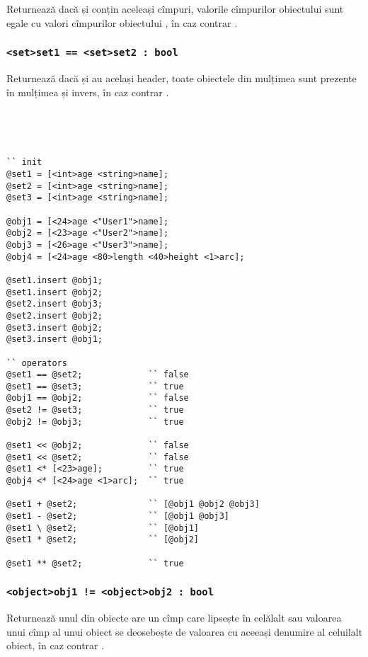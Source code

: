 Returnează \true{} dacă  și  conțin aceleași cîmpuri, valorile cîmpurilor obiectului  sunt egale cu valori cîmpurilor obiectului , în caz contrar \false{}.

\subsubsection{\lstinline|<set>set1 == <set>set2 : bool|}

Returnează \true{} dacă  și  au același header, toate obiectele din mulțimea  sunt prezente în mulțimea  și invers, în caz contrar \false{}.

\

\

\begin{lstlisting}[caption=Exemple de folosire al operatorilor asupra tipului object și set, label=setobjopex]
`` init
@set1 = [<int>age <string>name];
@set2 = [<int>age <string>name];
@set3 = [<int>age <string>name];

@obj1 = [<24>age <"User1">name];
@obj2 = [<23>age <"User2">name];
@obj3 = [<26>age <"User3">name];
@obj4 = [<24>age <80>length <40>height <1>arc];

@set1.insert @obj1;
@set1.insert @obj2;
@set2.insert @obj3;
@set2.insert @obj2;
@set3.insert @obj2;
@set3.insert @obj1;

`` operators
@set1 == @set2;				`` false
@set1 == @set3;				`` true
@obj1 == @obj2;				`` false
@set2 != @set3;				`` true
@obj2 != @obj3;				`` true

@set1 << @obj2;				`` false
@set1 << @set2;				`` false
@set1 <* [<23>age];			`` true
@obj4 <* [<24>age <1>arc];	`` true

@set1 + @set2;				`` [@obj1 @obj2 @obj3]
@set1 - @set2;				`` [@obj1 @obj3]
@set1 \ @set2;				`` [@obj1]
@set1 * @set2;				`` [@obj2]

@set1 ** @set2;				`` true
\end{lstlisting}

\subsubsection{\lstinline|<object>obj1 != <object>obj2 : bool|}

Returnează \true{} unul din obiecte are un cîmp care lipsește în celălalt sau valoarea unui cîmp al unui obiect se deosebește de valoarea cu aceeași denumire al celuilalt obiect, în caz contrar \false{}.

